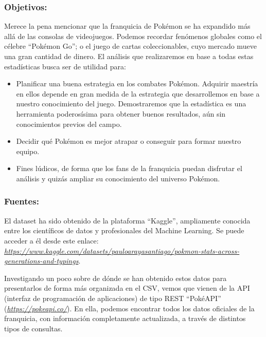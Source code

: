 \documentclass[
  11.8pt,
]{extreport}
\begin{document}
\subsubsection{Objetivos:}\label{objetivos}

Merece la pena mencionar que la franquicia de Pokémon se ha expandido
más allá de las consolas de videojuegos. Podemos recordar fenómenos
globales como el célebre ``Pokémon Go''; o el juego de cartas
coleccionables, cuyo mercado mueve una gran cantidad de dinero. El
análisis que realizaremos en base a todas estas estadísticas busca ser
de utilidad para:

\begin{itemize}
\item
  Planificar una buena estrategia en los combates Pokémon. Adquirir
  maestría en ellos depende en gran medida de la estrategia que
  desarrollemos en base a nuestro conocimiento del juego. Demostraremos
  que la estadística es una herramienta poderosísima para obtener buenos
  resultados, aún sin conocimientos previos del campo.
\item
  Decidir qué Pokémon es mejor atrapar o conseguir para formar nuestro
  equipo.
\item
  Fines lúdicos, de forma que los fans de la franquicia puedan disfrutar
  el análisis y quizás ampliar su conocimiento del universo Pokémon.
\end{itemize}

\subsubsection{Fuentes:}\label{fuentes}

El dataset ha sido obtenido de la plataforma ``Kaggle'', ampliamente
conocida entre los científicos de datos y profesionales del Machine
Learning. Se puede acceder a él desde este enlace:
\href{https://www.kaggle.com/datasets/pauloarayasantiago/pokmon-stats-across-generations-and-typings}{\emph{https://www.kaggle.com/datasets/pauloarayasantiago/pokmon-stats-across-generations-and-typings}}.

Investigando un poco sobre de dónde se han obtenido estos datos para
presentarlos de forma más organizada en el CSV, vemos que vienen de la
API (interfaz de programación de aplicaciones) de tipo REST ``PokéAPI''
(\href{https://pokeapi.co/}{\emph{https://pokeapi.co/}}). En ella,
podemos encontrar todos los datos oficiales de la franquicia, con
información completamente actualizada, a través de distintos tipos de
consultas.
\end{document}
